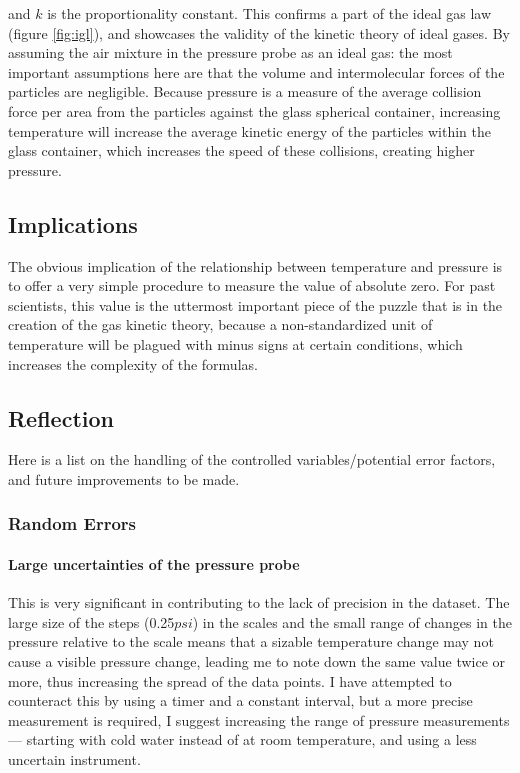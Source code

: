 \documentclass[a4paper,12pt]{article}
\begin{document}
and $k$ is the proportionality constant. This confirms a part of the ideal gas law (figure \ref{fig:igl}), and showcases the validity of the kinetic theory of ideal gases.
%
By assuming the air mixture in the pressure probe as an ideal gas: the most important assumptions here are that the volume and intermolecular forces of the particles are negligible. Because pressure is a measure of the average collision force per area from the particles against the glass spherical container, increasing temperature will increase the average kinetic energy of the particles within the glass container, which increases the speed of these collisions, creating higher pressure.

\subsection{Implications}
The obvious implication of the relationship between temperature and pressure is to offer a very simple procedure to measure the value of absolute zero. For past scientists, this value is the uttermost important piece of the puzzle that is in the creation of the gas kinetic theory, because a non-standardized unit of temperature will be plagued with minus signs at certain conditions, which increases the complexity of the formulas.

\subsection{Reflection}

Here is a list on the handling of the controlled variables/potential error factors, and future improvements to be made.

\subsubsection{Random Errors}
\paragraph{Large uncertainties of the pressure probe} This is very significant in contributing to the lack of precision in the dataset. The large size of the steps (0.25$\si{psi}$) in the scales and the small range of changes in the pressure relative to the scale means that a sizable temperature change may not cause a visible pressure change, leading me to note down the same value twice or more, thus increasing the spread of the data points. I have attempted to counteract this by using a timer and a constant interval, but a more precise measurement is required, I suggest increasing the range of pressure measurements --- starting with cold water instead of at room temperature, and using a less uncertain instrument.
\end{document}
